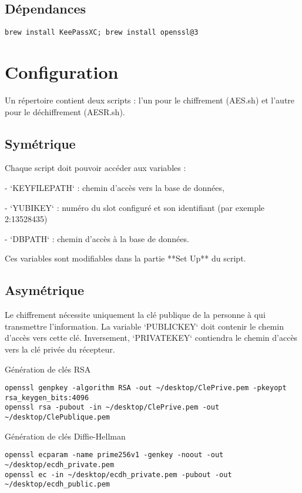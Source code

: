 \documentclass[conference]{IEEEtran}
\begin{document}
\subsection{Dépendances}
\begin{verbatim}
brew install KeePassXC; brew install openssl@3
\end{verbatim}

\section{Configuration}
Un répertoire contient deux scripts : l'un pour le chiffrement (AES.sh) et l'autre pour le déchiffrement (AESR.sh). 

\subsection{Symétrique}
Chaque script doit pouvoir accéder aux variables :  

- `KEYFILEPATH` : chemin d'accès vers la base de données,  

- `YUBIKEY` : numéro du slot configuré et son identifiant (par exemple 2:13528435)  


- `DBPATH` : chemin d'accès à la base de données.  

Ces variables sont modifiables dans la partie **Set Up** du script.

\subsection{Asymétrique}
Le chiffrement nécessite uniquement la clé publique de la personne à qui transmettre l'information. La variable `PUBLICKEY` doit contenir le chemin d'accès vers cette clé. Inversement, `PRIVATEKEY` contiendra le chemin d'accès vers la clé privée du récepteur. 

\begin{algorithm}[H]
    \caption{Génération de clés RSA}
    \label{alg:RSA}
    \begin{verbatim}
openssl genpkey -algorithm RSA -out ~/desktop/ClePrive.pem -pkeyopt rsa_keygen_bits:4096
openssl rsa -pubout -in ~/desktop/ClePrive.pem -out ~/desktop/ClePublique.pem
    \end{verbatim}
\end{algorithm}

\begin{algorithm}[H]
    \caption{Génération de clés Diffie-Hellman}
    \label{alg:DH}
    \begin{verbatim}
openssl ecparam -name prime256v1 -genkey -noout -out ~/desktop/ecdh_private.pem
openssl ec -in ~/desktop/ecdh_private.pem -pubout -out ~/desktop/ecdh_public.pem
    \end{verbatim}
\end{algorithm}
\end{document}
